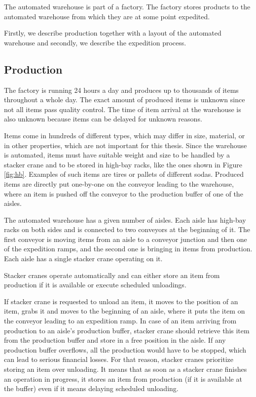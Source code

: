 \documentclass{ctuthesis}
\begin{document}
The automated warehouse is part of a factory. The factory stores products to the automated warehouse from which they are at some point expedited. 

Firstly, we describe production together with a layout of the automated warehouse and secondly, we describe the expedition process.

\subsection{Production} 
\label{subsec:production}
The factory is running 24 hours a day and produces up to thousands of items throughout a whole day. The exact amount of produced items is unknown since not all items pass quality control. The time of item arrival at the warehouse is also unknown because items can be delayed for unknown reasons.

Items come in hundreds of different types, which may differ in size, material, or in other properties, which are not important for this thesis. Since the warehouse is automated, items must have suitable weight and size to be handled by a stacker crane and to be stored in high-bay racks, like the ones shown in Figure \ref{fig:hb}. Examples of such items are tires or pallets of different sodas. Produced items are directly put one-by-one on the conveyor leading to the warehouse, where an item is pushed off the conveyor to the production buffer of one of the aisles.

The automated warehouse has a given number of aisles. Each aisle has high-bay racks on both sides and is connected to two conveyors at the beginning of it. The first conveyor is moving items from an aisle to a conveyor junction and then one of the expedition ramps, and the second one is bringing in items from production. Each aisle has a single stacker crane operating on it.

Stacker cranes operate automatically and can either store an item from production if it is available or execute scheduled unloadings. 

If stacker crane is requested to unload an item, it moves to the position of an item, grabs it and moves to the beginning of an aisle, where it puts the item on the conveyor leading to an expedition ramp. In case of an item arriving from production to an aisle's production buffer, stacker crane should retrieve this item from the production buffer and store in a free position in the aisle. If any production buffer overflows, all the production would have to be stopped, which can lead to serious financial losses. For that reason, stacker cranes prioritize storing an item over unloading. It means that as soon as a stacker crane finishes an operation in progress, it stores an item from production (if it is available at the buffer) even if it means delaying scheduled unloading.
\end{document}
